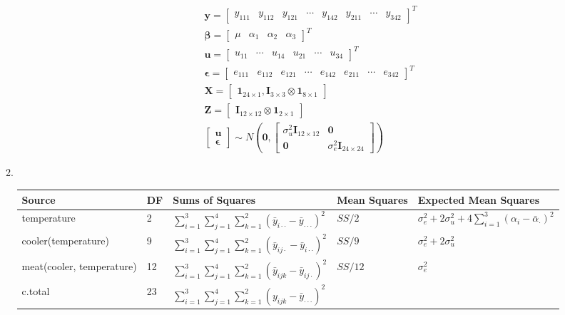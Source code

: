 \documentclass{article}
\begin{document}
\begin{enumerate}[leftmargin = 0 em, label = \arabic*., font = \bfseries]
\begin{enumerate}
	\begin{align*}
	&\bm y = \begin{bmatrix}
		y_{111}&
		y_{112}&
		y_{121}&
		\cdots&
		y_{142}&
		y_{211}&
		\cdots&
		y_{342}
	\end{bmatrix}^T\\
	& \bm \beta = \begin{bmatrix}
		\mu & 	\alpha_1 & \alpha_2 & \alpha_3
	\end{bmatrix}^T\\
	& \bm u = \begin{bmatrix}
		u_{11}&
		\cdots&
		u_{14}&
		u_{21}&
		\cdots&
		u_{34}
	\end{bmatrix}^T\\
	& \bm \epsilon = \begin{bmatrix}
		e_{111}&
		e_{112}&
		e_{121}&
		\cdots&
		e_{142}&
		e_{211}&
		\cdots&
		e_{342}
	\end{bmatrix}^T\\
	& \bm X = \begin{bmatrix}
		\bm 1_{24 \times 1} , \bm I_{3\times 3} \otimes \bm 1_{8\times 1}
	\end{bmatrix}\\
	& \bm Z = \begin{bmatrix}
		\bm I_{12 \times 12} \otimes \bm 1_{2 \times 1}
	\end{bmatrix}\\
	& \begin{bmatrix}
		\bm u\\
		\bm \epsilon
	\end{bmatrix} \sim N\left(\bm 0 , \begin{bmatrix}
			\sigma_u^2 \bm I_{12 \times 12} & \bm 0\\
			\bm 0& \sigma_{e}^2 \bm I_{24 \times 24}
		\end{bmatrix}\right)
	\end{align*}

	\item  \ 

	\hspace{-4em}
	\begin{tabular}{lllll}
	\toprule
	Source & DF& Sums of Squares & Mean Squares & Expected Mean Squares \\
	\midrule
	temperature & 2 & $\sum_{i = 1}^3 \sum_{j = 1}^4 \sum_{k = 1}^2 (\bar{y}_{i \cdot \cdot} - \bar{y}_{\cdot \cdot \cdot})^2$ & $SS/ 2 $ & $\sigma_e^2 + 2 \sigma_{u}^2 + 4 \sum_{i=1}^3 (\alpha_i - \bar{\alpha}_{\cdot})^2$\\
	cooler(temperature) & 9 & $\sum_{i = 1}^3 \sum_{j = 1}^4 \sum_{k = 1}^2 (\bar{y}_{i j\cdot} - \bar{y}_{i \cdot \cdot})^2$ & $SS/ 9 $ & $\sigma_e^2 + 2 \sigma_{u}^2 $\\ 
	meat(cooler, temperature) & 12 & $\sum_{i = 1}^3 \sum_{j = 1}^4 \sum_{k = 1}^2 (\bar{y}_{ijk} - \bar{y}_{ij\cdot})^2$ & $SS/ 12 $ & $\sigma_e^2$\\ 
	\midrule
	c.total & 23 & $\sum_{i=1}^3 \sum_{j=1}^4 \sum_{k=1}^2 (y_{ijk} - \bar{y}_{\cdot \cdot \cdot})^2$ \\
	\bottomrule
	\end{tabular}



\end{enumerate}
\end{enumerate}
\end{document}
